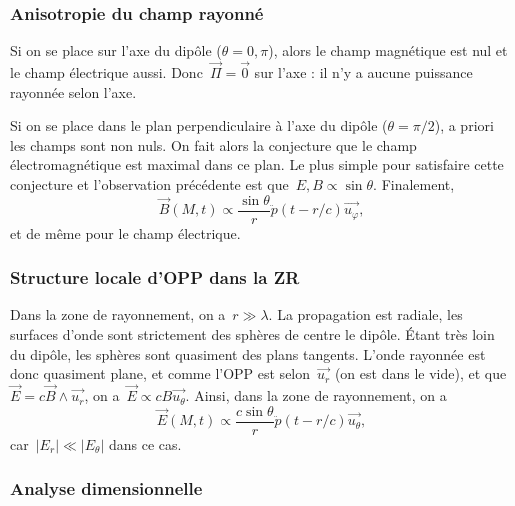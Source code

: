 \subsubsection{Anisotropie du champ rayonné}

Si on se place sur l'axe du dipôle ($\theta=0,\pi$), alors le champ magnétique est nul et le champ électrique aussi. Donc~$\vec{\Pi}=\vec{0}$ sur l'axe : il n'y a aucune puissance rayonnée selon l'axe.

Si on se place dans le plan perpendiculaire à l'axe du dipôle ($\theta=\pi/2$), a priori les champs sont non nuls. On fait alors la conjecture que le champ électromagnétique est maximal dans ce plan. Le plus simple pour satisfaire cette conjecture et l'observation précédente est que~$E,B\propto\sin\theta$.
Finalement,
\begin{equation*}
    \boxed{
        \vec{B}(M,t)\propto\frac{\sin\theta}{r}\ddot{p}(t-r/c)\vec{u_{\varphi}},
    }
\end{equation*}
et de même pour le champ électrique.

\subsubsection{Structure locale d'OPP dans la ZR}

Dans la zone de rayonnement, on a~$r\gg\lambda$. La propagation est radiale, les surfaces d'onde sont strictement des sphères de centre le dipôle. Étant très loin du dipôle, les sphères sont quasiment des plans tangents. L'onde rayonnée est donc quasiment plane, et comme l'OPP est selon~$\vec{u_r}$ (on est dans le vide), et que~$\vec{E}=c\vec{B}\wedge\vec{u_r}$, on a~$\vec{E}\propto cB\vec{u_{\theta}}$. Ainsi, dans la zone de rayonnement, on a
\begin{equation*}
    \boxed{
        \vec{E}(M,t)\propto\frac{c\sin\theta}{r}\ddot{p}(t-r/c)\vec{u_{\theta}},
    }
\end{equation*}
car~$\left\vert E_r\right\rvert\ll\left\lvert E_{\theta}\right\rvert$ dans ce cas.

\subsubsection{Analyse dimensionnelle}

